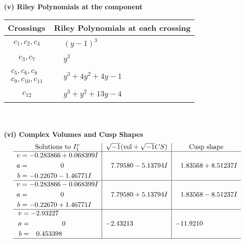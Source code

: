 \documentclass[1p]{elsarticle_modified}
\theoremstyle{definition}
\newcommand{\I}{\sqrt{-1}}
\begin{document}
\newpage\renewcommand{\arraystretch}{1}
\flushleft \textbf{(v) Riley Polynomials at the component}\newline \\
\begin{tabular}{m{50pt}|m{274pt}}
Crossings & \hspace{64pt}Riley Polynomials at each crossing \\
\hline $$\begin{aligned}c_{1},c_{2},c_{4}\end{aligned}$$&$\begin{aligned}
&(y-1)^3
\end{aligned}$\\
\hline $$\begin{aligned}c_{3},c_{7}\end{aligned}$$&$\begin{aligned}
&y^3
\end{aligned}$\\
\hline $$\begin{aligned}c_{5},c_{6},c_{8}\\c_{9},c_{10},c_{11}\end{aligned}$$&$\begin{aligned}
&y^3+4 y^2+4 y-1
\end{aligned}$\\
\hline $$\begin{aligned}c_{12}\end{aligned}$$&$\begin{aligned}
&y^3+y^2+13 y-4
\end{aligned}$\\
\hline
\end{tabular}\\~\\
\newpage\flushleft \textbf{(vi) Complex Volumes and Cusp Shapes}
$$\begin{array}{c|c|c}  
\text{Solutions to }I^v_{1}& \I (\text{vol} + \sqrt{-1}CS) & \text{Cusp shape}\\
 \hline 
\begin{aligned}
v &= -0.283866 + 0.068399 I \\
a &= \phantom{-0.000000 } 0 \\
b &= -0.22670 - 1.46771 I\end{aligned}
 & \phantom{-}7.79580 - 5.13794 I & \phantom{-}1.83568 + 8.51237 I \\ \hline\begin{aligned}
v &= -0.283866 - 0.068399 I \\
a &= \phantom{-0.000000 } 0 \\
b &= -0.22670 + 1.46771 I\end{aligned}
 & \phantom{-}7.79580 + 5.13794 I & \phantom{-}1.83568 - 8.51237 I \\ \hline\begin{aligned}
v &= -2.93227\phantom{ +0.000000I} \\
a &= \phantom{-0.000000 } 0 \\
b &= \phantom{-}0.453398\phantom{ +0.000000I}\end{aligned}
 & -2.43213\phantom{ +0.000000I} & -11.9210\phantom{ +0.000000I}\\
 \hline 
 \end{array}$$\newpage\newpage\renewcommand{\arraystretch}{1}
\end{document}
